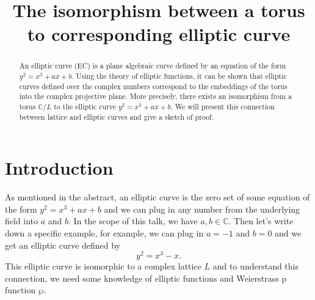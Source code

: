\documentclass[psamsfonts]{amsart}
\theoremstyle{definition}
\theoremstyle{remark}
\numberwithin{equation}{section}
\begin{document}
	\title{The isomorphism between a torus to corresponding elliptic curve}
	\begin{abstract}
		An elliptic curve (EC) is a plane algebraic curve defined by an equation of the form $y^2 = x^3 + ax + b$. Using the theory of elliptic functions, it can be shown that elliptic curves defined over the complex numbers correspond to the embeddings of the torus into the complex projective plane. More precisely, there exists an isomorphism from a torus $\mathbb{C}/L$ to the elliptic curve $y^2 = x^3 +ax + b$. We will present this connection between lattice and elliptic curves and give a sketch of proof.
	\end{abstract}
	
	\maketitle
	
	\section{Introduction}	
		As mentioned in the abstract, an elliptic curve is the zero set of some equation of the form $y^2 = x^3 + ax + b$ and we can plug in any number from the underlying field into $a$ and $b$. In the scope of this talk, we have $a, b \in \mathbb{C}$. Then let's write down a specific example, for example, we can plug in $a=-1$ and $b=0$ and we get an elliptic curve defined by 
		\begin{equation}
			y^2 = x^3 - x.
		\end{equation}
		This elliptic curve is isomorphic to a complex lattice $L$ and to understand this connection, we need some knowledge of elliptic functions and Weierstrass p function $\wp$.
\end{document}
